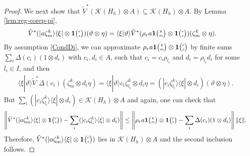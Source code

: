 \begin{proof}
   We next show that $\tilde V^{*}(\mathcal{K}(H_{h}) \otimes A)
   \subseteq \mathcal{K}(H_{h}) \otimes A$.  By Lemma
   \ref{lem:reg-corep-pi},
   \begin{align*}
     \tilde V^{*}(|a\zeta^{k}_{m}\rangle\langle\xi| \otimes
     \mathbf{1}{\tiny {\begin{pmatrix} r\\s\end{pmatrix}}})(\vartheta\otimes \eta) &=  \langle
     \xi|\vartheta\rangle \tilde V^{*}(\rho_{r}a\mathbf{1}{\tiny {\begin{pmatrix} k\\m\end{pmatrix}}}\otimes
     \mathbf{1}{\tiny {\begin{pmatrix} r\\s\end{pmatrix}}})(\zeta^{k}_{m} \otimes \eta).
   \end{align*}
   By assumption \eqref{CondDi}, we can approximate $\rho_{r}a
   \mathbf{1}{\tiny {\begin{pmatrix} k\\m\end{pmatrix}}}\otimes
   \mathbf{1}{\tiny {\begin{pmatrix} r\\s\end{pmatrix}}}$ by finite sums $\sum_{i} \Delta(c_{i})(1 \otimes d_{i})$ with
   $c_{i}, d_{i} \in A$, such that $c_{i} =c_{i}\rho_{l_{i}}$ and   $d_{i}=\rho_{l_{i}}d_{i}$ for some $l_{i} \in I$, and then
   \begin{align*}
     \langle \xi|\vartheta\rangle \tilde
     V^{*}\Delta(c_{i})(\zeta^{k}_{m}\otimes d_{i}\eta) = \langle
     \xi|\vartheta\rangle c_{i}\zeta^{k}_{l_{i}} \otimes d_{i}\eta =
     (|c_{i}\zeta^{k}_{l_{i}}\rangle\langle\xi| \otimes
     d_{i})(\vartheta\otimes \eta).
   \end{align*}
But $\sum_{i}     (|c_{i}\zeta^{k}_{l_{i}}\rangle\langle\xi| \otimes
     d_{i}) \in \mathcal{K}(H_{h}) \otimes A$ and again, one can check   that%
     \begin{align*}
       \left\|      \tilde V^{*}(|a\zeta^{k}_{m}\rangle\langle\xi| \otimes
     \mathbf{1}{\tiny {\begin{pmatrix} r\\s\end{pmatrix}}}) - \sum_{i}     (|c_{i}\zeta^{k}_{l_{i}}\rangle\langle\xi| \otimes
     d_{i})  \right\| \leq \left\|
\rho_{r}a
   \mathbf{1}{\tiny {\begin{pmatrix} k\\m\end{pmatrix}}}\otimes
   \mathbf{1}{\tiny {\begin{pmatrix} r\\s\end{pmatrix}}} - \sum_{i} \Delta(c_{i})(1 \otimes d_{i})
   \right\|\|\xi\|.
     \end{align*}
     Therefore, $   \tilde V^{*}(|a\zeta^{k}_{m}\rangle\langle\xi| \otimes
     \mathbf{1}{\tiny {\begin{pmatrix} r\\s\end{pmatrix}}})$ lies in $\mathcal{K}(H_{h}) \otimes A$ and the    second inclusion follows.
\end{proof}
